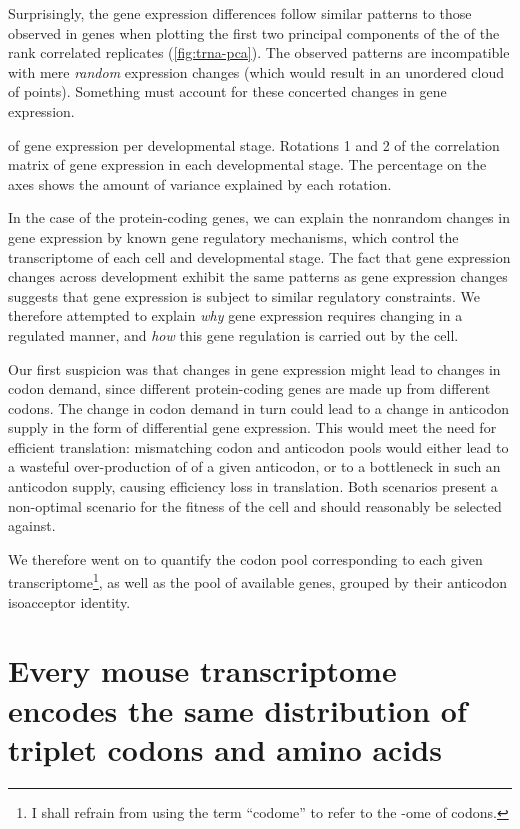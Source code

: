 Surprisingly, the \trna gene expression differences follow similar patterns to
those observed in \mrna genes when plotting the first two principal components
of the \pca of the rank correlated replicates (\cref{fig:trna-pca}). The
observed patterns are incompatible with mere \emph{random} expression changes
(which would result in an unordered cloud of points). Something must account for
these concerted changes in \trna gene expression.

    {\pca of \trna gene expression per developmental stage.}
    {Rotations \num{1} and \num{2} of the correlation matrix of
    \trna gene expression in each developmental stage. The percentage on the
    axes shows the amount of variance explained by each rotation.}

In the case of the protein-coding genes, we can explain the nonrandom changes in
gene expression by known gene regulatory mechanisms, which control the
transcriptome of each cell and developmental stage. The fact that \trna gene
expression changes across development exhibit the same patterns as \mrna gene
expression changes suggests that \trna gene expression is subject to similar
regulatory constraints. We therefore attempted to explain \emph{why} \trna gene
expression requires changing in a regulated manner, and \emph{how} this \trna
gene regulation is carried out by the cell.

Our first suspicion was that changes in \mrna gene expression might lead to
changes in codon demand, since different protein-coding genes are made up from
different codons. The change in codon demand in turn could lead to a change in
anticodon supply in the form of differential \trna gene expression. This would
meet the need for efficient translation: mismatching codon and anticodon pools
would either lead to a wasteful over-production of \trna[s] of a given
anticodon, or to a bottleneck in such an anticodon supply, causing efficiency
loss in translation. Both scenarios present a non-optimal scenario for the
fitness of the cell and should reasonably be selected against.

We therefore went on to quantify the codon pool corresponding to each given
transcriptome\footnote{I shall refrain from using the term “codome” to refer to
the -ome of codons.}, as well as the pool of available \trna genes, grouped by
their anticodon isoacceptor identity.

\section{Every mouse  transcriptome encodes the same distribution of
triplet codons and amino acids}

